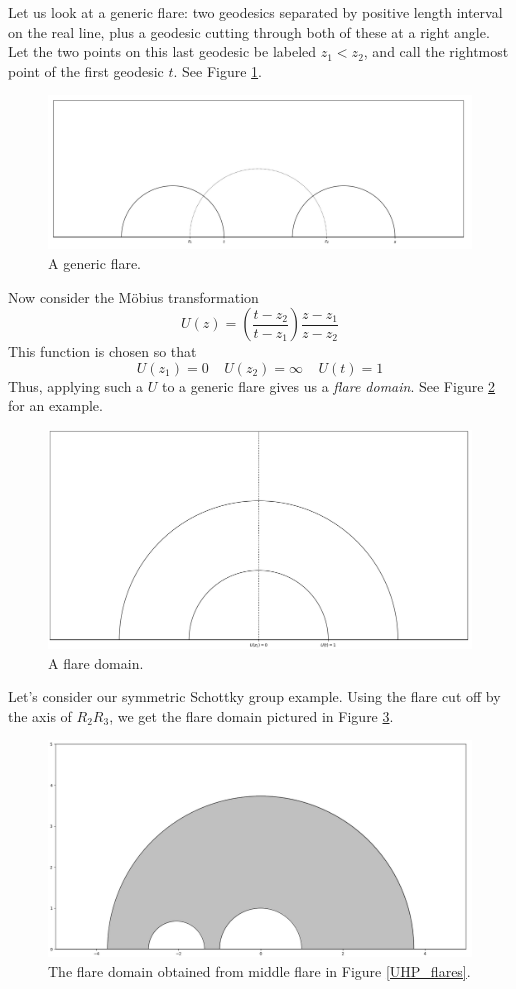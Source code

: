 \documentclass[]{article}
\begin{document}
Let us look at a generic flare: two geodesics separated by positive length interval on the real line, plus a geodesic cutting through both of these at a right angle.
Let the two points on this last geodesic be labeled $z_1 < z_2$, and call the rightmost point of the first geodesic $t$.
See Figure \ref{pre_flare}.
\begin{figure}[h]
	\centering
	\includegraphics[width=0.6\linewidth]{labeled_pre_flare.png}
	\caption{A generic flare.}
	\label{pre_flare}
\end{figure}
Now consider the M\"obius transformation
$$
U(z) = \left( \frac{t - z_2}{t - z_1} \right) \frac{z - z_1}{z - z_2}
$$
This function is chosen so that
$$
U(z_1) = 0 ~~~~~ U(z_2) = \infty ~~~~~ U(t) = 1
$$
Thus, applying such a $U$ to a generic flare gives us a \textit{flare domain}.
See Figure \ref{post_flare} for an example.
\begin{figure}[h]
	\centering
	\includegraphics[width=0.6\linewidth]{labeled_flare.png}
	\caption{A flare domain.}
	\label{post_flare}
\end{figure}

Let's consider our symmetric Schottky group example.
Using the flare cut off by the axis of $R_2R_3$, we get the flare domain pictured in Figure \ref{flare}.
\begin{figure}[h]
	\centering
	\includegraphics[width=0.6\linewidth]{flare.png}
	\caption{The flare domain obtained from middle flare in Figure \ref{UHP_flares}.}
	\label{flare}
\end{figure}
\end{document}
